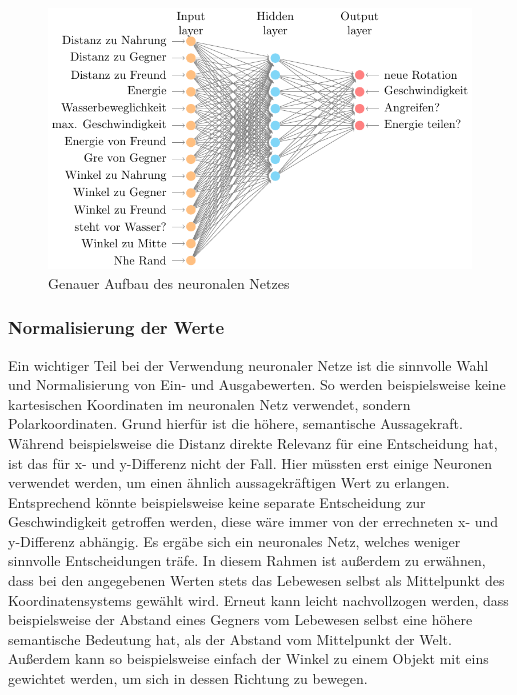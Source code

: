\documentclass[course=erap]{aspdoc}
\begin{document}
\begin{figure}[H]
    \centering
    \includegraphics[width=.85\textwidth]{res/neuralnet.pdf}
    \caption{Genauer Aufbau des neuronalen Netzes}
    \label{fig:neural-net}
\end{figure}

\subsubsection{Normalisierung der Werte}
Ein wichtiger Teil bei der Verwendung neuronaler Netze ist die sinnvolle Wahl und Normalisierung von Ein- und Ausgabewerten. So werden beispielsweise keine kartesischen Koordinaten im neuronalen Netz verwendet, sondern Polarkoordinaten. Grund hierfür ist die höhere, semantische Aussagekraft. Während beispielsweise die Distanz direkte Relevanz für eine Entscheidung hat, ist das für x- und y-Differenz nicht der Fall. Hier müssten erst einige Neuronen verwendet werden, um einen ähnlich aussagekräftigen Wert zu erlangen. Entsprechend könnte beispielsweise keine separate Entscheidung zur Geschwindigkeit getroffen werden, diese wäre immer von der errechneten x- und y-Differenz abhängig. Es ergäbe sich ein neuronales Netz, welches weniger sinnvolle Entscheidungen träfe. In diesem Rahmen ist außerdem zu erwähnen, dass bei den angegebenen Werten stets das Lebewesen selbst als Mittelpunkt des Koordinatensystems gewählt wird. Erneut kann leicht nachvollzogen werden, dass beispielsweise der Abstand eines Gegners vom Lebewesen selbst eine höhere semantische Bedeutung hat, als der Abstand vom Mittelpunkt der Welt. Außerdem kann so beispielsweise einfach der Winkel zu einem Objekt mit eins gewichtet werden, um sich in dessen Richtung zu bewegen.
\end{document}
